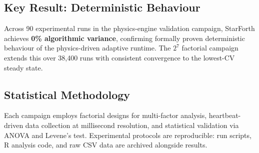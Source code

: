 \subsection{Key Result: Deterministic Behaviour}

Across 90 experimental runs in the physics-engine validation campaign, StarForth
achieves \textbf{0\% algorithmic variance}, confirming formally proven deterministic
behaviour of the physics-driven adaptive runtime. The $2^7$ factorial campaign
extends this over 38{,}400 runs with consistent convergence to the lowest-CV
steady state.

\subsection{Statistical Methodology}

Each campaign employs factorial designs for multi-factor analysis, heartbeat-driven
data collection at millisecond resolution, and statistical validation via ANOVA and
Levene's test. Experimental protocols are reproducible: run scripts, R analysis
code, and raw CSV data are archived alongside results.

